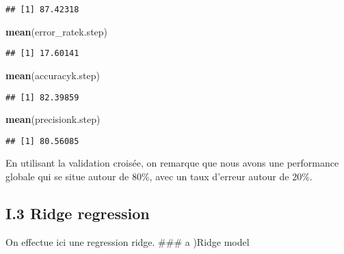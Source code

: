 \documentclass[
]{article}
\newenvironment{Shaded}{\begin{snugshade}}{\end{snugshade}}
\newcommand{\KeywordTok}[1]{\textcolor[rgb]{0.13,0.29,0.53}{\textbf{#1}}}
\newcommand{\NormalTok}[1]{#1}
\begin{document}
\begin{verbatim}
## [1] 87.42318
\end{verbatim}

\begin{Shaded}
\begin{Highlighting}[]
\KeywordTok{mean}\NormalTok{(error_ratek.step)}
\end{Highlighting}
\end{Shaded}

\begin{verbatim}
## [1] 17.60141
\end{verbatim}

\begin{Shaded}
\begin{Highlighting}[]
\KeywordTok{mean}\NormalTok{(accuracyk.step)}
\end{Highlighting}
\end{Shaded}

\begin{verbatim}
## [1] 82.39859
\end{verbatim}

\begin{Shaded}
\begin{Highlighting}[]
\KeywordTok{mean}\NormalTok{(precisionk.step)}
\end{Highlighting}
\end{Shaded}

\begin{verbatim}
## [1] 80.56085
\end{verbatim}

En utilisant la validation croisée, on remarque que nous avons une
performance globale qui se situe autour de 80\%, avec un taux d'erreur
autour de 20\%.

\hypertarget{i.3-ridge-regression}{%
\subsection{I.3 Ridge regression}\label{i.3-ridge-regression}}

On effectue ici une regression ridge. \#\#\# a )Ridge model
\end{document}
